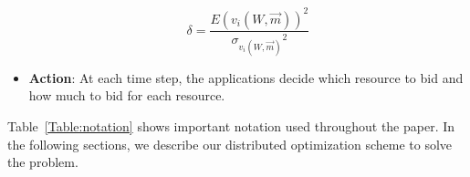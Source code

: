 \begin{itemize}
\begin{equation}
\delta =  \frac{E(v_{i}(W,\vec{m}))^2}{{\sigma_{v_{i}(W,\vec{m})}}^2}
\end{equation}  
  \item \textbf{Action}: At each time step, the applications decide which resource to bid and how much to bid for each resource. 
\end{itemize} 
\indent Table~\ref{Table:notation} shows important notation used throughout the paper. In the following sections, we describe our distributed optimization scheme to solve the problem. 
\vspace{-1\baselineskip}
